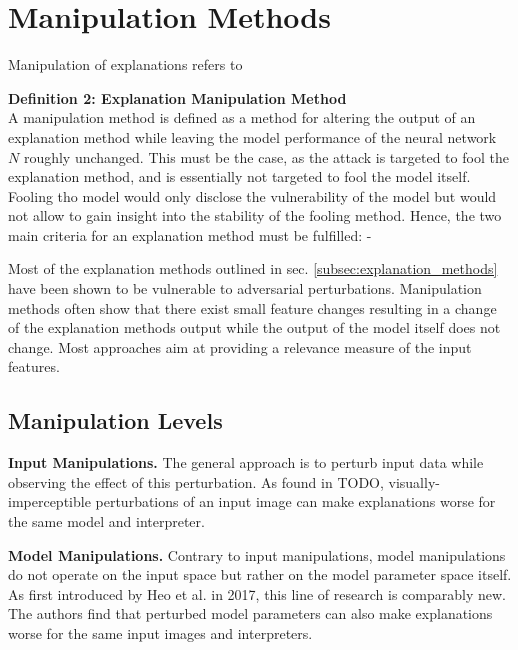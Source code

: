 \section{Manipulation Methods}
\label{sec:manipulation_methods}
Manipulation of explanations refers to 

\textbf{Definition 2: Explanation Manipulation Method}\\
A manipulation method is defined as a method for altering the output of an explanation method while leaving the model performance of the neural network $N$ roughly unchanged. 
This must be the case, as the attack is targeted to fool the explanation method, and is essentially not targeted to fool the model itself. Fooling tho model would only disclose the vulnerability of the model but would not allow to gain insight into the stability of the fooling method. 
Hence, the two main criteria for an explanation method must be fulfilled: 
- 




Most of the explanation methods outlined in sec. \autoref{subsec:explanation_methods} have been shown to be vulnerable to adversarial perturbations. 
Manipulation methods often show that there exist small feature changes resulting in a change of the explanation methods output while the output of the model itself does not change. 
Most approaches aim at providing a relevance measure of the input features. \\


\subsection{Manipulation Levels}
\label{subsec:manipulation_levels}

\noindent\textbf{Input Manipulations.} The general approach is to perturb input data while observing the effect of this perturbation. As found in TODO, visually-imperceptible perturbations of an input image can make explanations worse for the same model and interpreter. 


\noindent\textbf{Model Manipulations.} 
Contrary to input manipulations, model manipulations do not operate on the input space but rather on the model parameter space itself. 
As first introduced by Heo et al. \cite{fooling_nn_interpreters} in 2017, this line of research is comparably new. The authors find that perturbed model parameters can also make explanations worse for the same input images and interpreters. 


